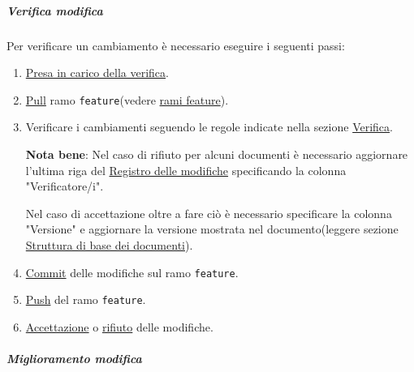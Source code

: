 \subparagraph{Verifica modifica}
Per verificare un cambiamento è necessario eseguire i seguenti passi:
\begin{enumerate}
    \item \hyperref[subpar:presa_carico_verifica]{Presa in carico della verifica}.
    
    \item \hyperref[subpar:pull]{Pull} ramo \texttt{feature}(vedere \hyperref[item:rami_feature]{rami feature}).
    
    \item Verificare i cambiamenti seguendo le regole indicate nella sezione \hyperref[]{Verifica}.
    
    \textbf{Nota bene}: Nel caso di rifiuto per alcuni documenti è necessario aggiornare l'ultima riga del \hyperref[par:registro_delle_modifiche]{Registro delle modifiche} specificando la colonna "Verificatore/i".

    Nel caso di accettazione oltre a fare ciò è necessario specificare la colonna "Versione" e aggiornare la versione mostrata nel documento(leggere sezione \hyperref[par:struttura_di_base_documenti]{Struttura di base dei documenti}).

    \item \hyperref[subpar:commit]{Commit} delle modifiche sul ramo \texttt{feature}.
    
    \item \hyperref[subpar:push]{Push} del ramo \texttt{feature}.

    \item \hyperref[subpar:accettazione_modifiche]{Accettazione} o \hyperref[subpar:rifiuto_modifiche]{rifiuto} delle modifiche.
\end{enumerate}

\subparagraph{Miglioramento modifica}
  
